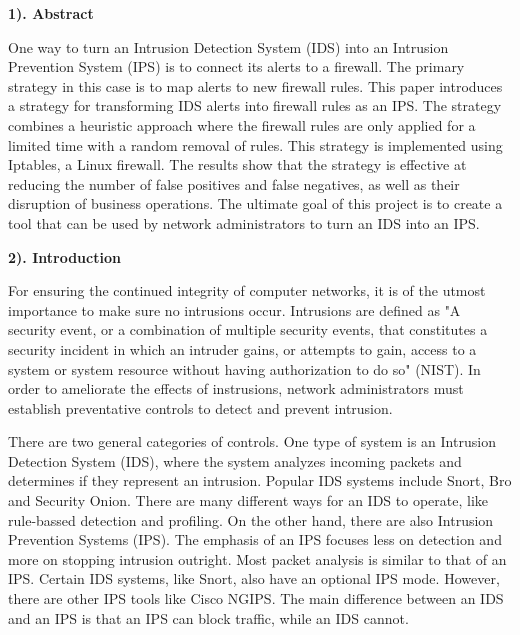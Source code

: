\documentclass[12pt]{article}
\begin{document}
\begin{flushleft}

\setlength{\parindent}{0.5in}

\begin{multicols}{2}
    
\textbf{1). Abstract}

One way to turn an Intrusion Detection System (IDS) into an Intrusion Prevention System (IPS) is to connect its alerts to a firewall. The primary strategy in this case is to map alerts to new firewall rules. This paper introduces a strategy for transforming IDS alerts into firewall rules as an IPS. The strategy combines a heuristic approach where the firewall rules are only applied for a limited time with a random removal of rules. This strategy is implemented using Iptables, a Linux firewall. The results show that the strategy is effective at reducing the number of false positives and false negatives, as well as their disruption of business operations. The ultimate goal of this project is to create a tool that can be used by network administrators to turn an IDS into an IPS.

\textbf{2). Introduction}

For ensuring the continued integrity of computer networks, it is of the utmost importance to make sure no intrusions occur. Intrusions are defined as "A security event, or a combination of multiple security events, that constitutes a security incident in which an intruder gains, or attempts to gain, access to a system or system resource without having authorization to do so" (NIST). In order to ameliorate the effects of instrusions, network administrators must establish preventative controls to detect and prevent intrusion.

There are two general categories of controls. One type of system is an Intrusion Detection System (IDS), where the system analyzes incoming packets and determines if they represent an intrusion. Popular IDS systems include Snort, Bro and Security Onion. There are many different ways for an IDS to operate, like rule-bassed detection and profiling. On the other hand, there are also Intrusion Prevention Systems (IPS). The emphasis of an IPS focuses less on detection and more on stopping intrusion outright. Most packet analysis is similar to that of an IPS. Certain IDS systems, like Snort, also have an optional IPS mode. However, there are other IPS tools like Cisco NGIPS. The main difference between an IDS and an IPS is that an IPS can block traffic, while an IDS cannot.


\end{multicols}
\end{flushleft}
\end{document}
